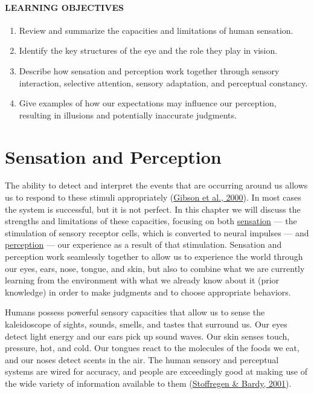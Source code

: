 \documentclass[
]{krantz}
\providecommand{\tightlist}{%
  \setlength{\itemsep}{0pt}\setlength{\parskip}{0pt}}
\begin{document}
\hypertarget{learning-objectives-1}{%
\paragraph*{LEARNING OBJECTIVES}\label{learning-objectives-1}}

\begin{enumerate}
\def\labelenumi{\arabic{enumi}.}
\tightlist
\item
  Review and summarize the capacities and limitations of human sensation.
\item
  Identify the key structures of the eye and the role they play in vision.
\item
  Describe how sensation and perception work together through sensory interaction, selective attention, sensory adaptation, and perceptual constancy.
\item
  Give examples of how our expectations may influence our perception, resulting in illusions and potentially inaccurate judgments.
\end{enumerate}

\hypertarget{sensation-and-perception}{%
\section{Sensation and Perception}\label{sensation-and-perception}}

The ability to detect and interpret the events that are occurring around us allows us to respond to these stimuli appropriately (\protect\hyperlink{ref-Gibson2000}{Gibson et al., 2000}). In most cases the system is successful, but it is not perfect. In this chapter we will discuss the strengths and limitations of these capacities, focusing on both \protect\hyperlink{sensation}{sensation} --- the stimulation of sensory receptor cells, which is converted to neural impulses --- and \protect\hyperlink{perception}{perception} --- our experience as a result of that stimulation. Sensation and perception work seamlessly together to allow us to experience the world through our eyes, ears, nose, tongue, and skin, but also to combine what we are currently learning from the environment with what we already know about it (prior knowledge) in order to make judgments and to choose appropriate behaviors.

Humans possess powerful sensory capacities that allow us to sense the kaleidoscope of sights, sounds, smells, and tastes that surround us. Our eyes detect light energy and our ears pick up sound waves. Our skin senses touch, pressure, hot, and cold. Our tongues react to the molecules of the foods we eat, and our noses detect scents in the air. The human sensory and perceptual systems are wired for accuracy, and people are exceedingly good at making use of the wide variety of information available to them (\protect\hyperlink{ref-Stoffregen2001}{Stoffregen \& Bardy, 2001}).
\end{document}
